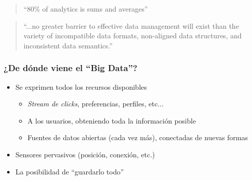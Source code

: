 \documentclass[14pt]{beamer}
\begin{document}
\begin{frame}[plain]
  \begin{quote}
{\Large ``80\% of analytics is sums and averages''} \\

  \hspace*{}
  \end{quote}
\end{frame}

\begin{frame}[plain]
  \begin{quote}

    {\Large ``...no greater barrier to effective data management will exist
      than the variety of incompatible data formats, non-aligned data
      structures, and inconsistent data
      semantics.''} \\

\hspace*{}
  \end{quote}
\end{frame}


\begin{frame}
  \frametitle{¿De dónde viene el ``Big Data''?}
\begin{itemize}
\item Se exprimen todos los recursos disponibles
  \begin{itemize}
  \item {\em Stream de clicks}, preferencias, perfiles, etc...
  \item A los usuarios, obteniendo toda la información posible
  \item Fuentes de datos abiertas (cada vez más), conectadas de nuevas
    formas
  \end{itemize}
\item Sensores pervasivos (posición, conexión, etc.)
  \item La posibilidad de ``guardarlo todo''
\end{itemize}
\end{frame}
\end{document}
